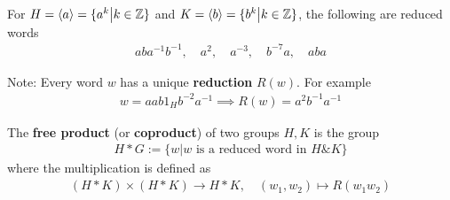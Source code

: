 \begin{ex}[]
  For $H = \langle a\rangle = \{a^{k} \big\vert k \in \mathbb{Z}\}$ and $K = \langle b\rangle = \{b^{k} \big\vert k \in \mathbb{Z}\}$, the following are reduced words
  \begin{align*}
    aba^{-1}b^{-1}, \quad a^{2}, \quad a^{-3}, \quad b^{-7}a, \quad aba
  \end{align*}
\end{ex}
Note: Every word $w$ has a unique \textbf{reduction} $R(w)$. For example
\begin{align*}
  w = aab1_Hb^{-2}a^{-1} \implies R(w) = a^{2}b^{-1}a^{-1}
\end{align*}

\begin{dfn}[]
  The \textbf{free product} (or \textbf{coproduct}) of two groups $H,K$ is the group
\begin{align*}
  H \ast G := \{w \big\vert w \text{ is a reduced word in } H\& K\}
\end{align*}
where the multiplication is defined as
\begin{align*}
  (H \ast K) \times (H \ast K) \to H \ast K, \quad (w_1,w_2) \mapsto R(w_1w_2)
\end{align*}
\end{dfn}

